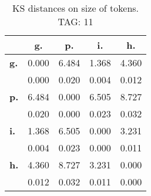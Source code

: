 \begin{table}[h!]
\begin{center}
\begin{tabular}{| l || c | c | c | c |}\hline
 & {\bf g.} & {\bf p.} & {\bf i.} & {\bf h.} \\\hline\hline
{\bf g.} & 0.000 & 6.484 & 1.368 & 4.360 \\
{\bf } & 0.000 & 0.020 & 0.004 & 0.012 \\\hline
{\bf p.} & 6.484 & 0.000 & 6.505 & 8.727 \\
{\bf } & 0.020 & 0.000 & 0.023 & 0.032 \\\hline
{\bf i.} & 1.368 & 6.505 & 0.000 & 3.231 \\
{\bf } & 0.004 & 0.023 & 0.000 & 0.011 \\\hline
{\bf h.} & 4.360 & 8.727 & 3.231 & 0.000 \\
{\bf } & 0.012 & 0.032 & 0.011 & 0.000 \\\hline
\end{tabular}
\caption{KS distances on size of tokens. TAG: 11}
\end{center}
\end{table}